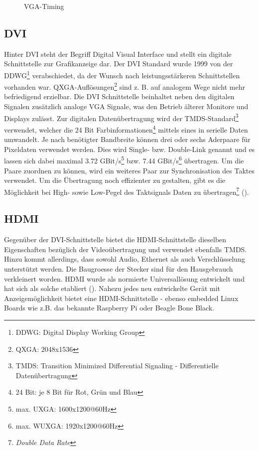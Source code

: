 \begin{figure}[htp]
	\centering
{}
	\caption{VGA-Timing}
	\label{fig:vga_timing}
\end{figure}

\subsection{DVI}
Hinter DVI steht der Begriff Digital Visual Interface und stellt ein digitale Schnittstelle zur Grafikanzeige dar. Der DVI Standard wurde 1999 von der DDWG\footnote{DDWG: Digital Display Working Group} verabschiedet, da der Wunsch nach leistungsstärkeren Schnittstellen vorhanden war. QXGA-Auflösungen\footnote{QXGA: 2048x1536} sind z. B. auf analogem Wege nicht mehr befriedigend erzielbar. Die DVI Schnittstelle beinhaltet neben den digitalen Signalen zusätzlich analoge VGA Signale, was den Betrieb älterer Monitore und Displays zulässt. Zur digitalen Datenübertragung wird der TMDS-Standard\footnote{TMDS: Transition Minimized Differential Signaling - Differentielle Datenübertragung} verwendet, welcher die 24 Bit Farbinformationen\footnote{24 Bit: je 8 Bit für Rot, Grün und Blau} mittels eines  in serielle Daten umwandelt. Je nach benötigter Bandbreite können drei oder sechs Aderpaare für Pixeldaten verwendet werden. Dies wird Single- bzw. Double-Link genannt und es lassen sich dabei maximal 3.72 GBit/s\footnote{max. UXGA: 1600x1200@60Hz} bzw. 7.44 GBit/s\footnote{max. WUXGA: 1920x1200@60Hz} übertragen. Um die Paare zuordnen zu können, wird ein weiteres Paar zur Synchronisation des Taktes verwendet. Um die Übertragung noch effizienter zu gestalten, gibt es die Möglichkeit bei High- sowie Low-Pegel des Taktsignals Daten zu übertragen\footnote{\textit{Double Data Rate}} (\cite{Leunig2002}).

\subsection{HDMI}
Gegenüber der DVI-Schnittstelle bietet die HDMI-Schnittstelle dieselben Eigenschaften bezüglich der Videoübertragung und verwendet ebenfalls TMDS. Hinzu kommt allerdings, dass sowohl Audio, Ethernet als auch Verschlüsselung unterstützt werden. Die Baugroesse der Stecker sind für den Hausgebrauch verkleinert worden. HDMI wurde als normierte Universallösung entwickelt und hat sich als solche etabliert (\cite{Extron2014}). Nahezu jedes neu entwickelte Gerät mit Anzeigemöglichkeit bietet eine HDMI-Schnittstelle - ebenso embedded Linux Boards wie z.B. das bekannte Raspberry Pi oder Beagle Bone Black.

